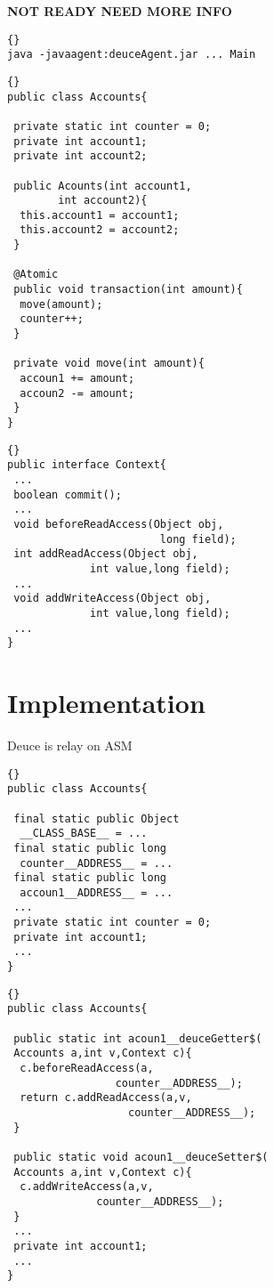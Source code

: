 \documentclass[preprint,natbib,10pt]{sigplanconf}
\begin{document}
\textbf{NOT READY NEED MORE INFO}

\lstset{language=bash}
\lstset{commentstyle=\textit}
\begin{lstlisting}[frame=trbl,caption=Running an application under Deuce,label=lst:bash]{}
java -javaagent:deuceAgent.jar ... Main
\end{lstlisting}

\lstset{language=java}
\lstset{commentstyle=\textit}
\begin{lstlisting}[frame=trbl,caption=@Atomic method example,label=lst:example]{}
public class Accounts{

 private static int counter = 0;
 private int account1;
 private int account2;
 
 public Acounts(int account1,
		int account2){
  this.account1 = account1;
  this.account2 = account2;
 }

 @Atomic
 public void transaction(int amount){
  move(amount);
  counter++;
 }

 private void move(int amount){
  accoun1 += amount;
  accoun2 -= amount;
 }
}
\end{lstlisting}

\lstset{language=java}
\lstset{commentstyle=\textit}
\begin{lstlisting}[frame=trbl,caption=Context interface,label=lst:context]{}
public interface Context{
 ...
 boolean commit();
 ...
 void beforeReadAccess(Object obj,
                        long field);
 int addReadAccess(Object obj, 
             int value,long field);
 ...
 void addWriteAccess(Object obj,
             int value,long field);
 ...
}
\end{lstlisting}

\section{Implementation}
Deuce is relay on ASM\cite{1294344}

\lstset{language=java}
\lstset{commentstyle=\textit}
\begin{lstlisting}[frame=trbl,caption=Fields address,label=lst:address]{}
public class Accounts{

 final static public Object 
  __CLASS_BASE__ = ...
 final static public long 
  counter__ADDRESS__ = ...
 final static public long 
  accoun1__ADDRESS__ = ...
 ...
 private static int counter = 0;
 private int account1;
 ...
}
\end{lstlisting} 

\lstset{language=java}
\lstset{commentstyle=\textit}
\begin{lstlisting}[frame=trbl,caption=Fields accessors,label=lst:access]{}
public class Accounts{

 public static int acoun1__deuceGetter$(
 Accounts a,int v,Context c){
  c.beforeReadAccess(a,
                 counter__ADDRESS__); 
  return c.addReadAccess(a,v,
                   counter__ADDRESS__);
 }
 
 public static void acoun1__deuceSetter$(
 Accounts a,int v,Context c){
  c.addWriteAccess(a,v,
              counter__ADDRESS__);
 }
 ...
 private int account1;
 ...
}
\end{lstlisting}
\end{document}
